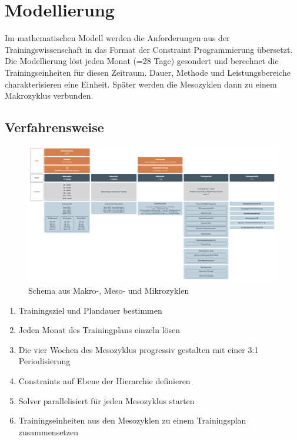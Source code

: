 \chapter{Modellierung}
\label{sec:modellierung}
Im mathematischen Modell werden die Anforderungen aus der Trainingswissenschaft in das Format der Constraint Programmierung übersetzt. Die Modellierung löst jeden Monat (=28 Tage) gesondert und berechnet die Trainingseinheiten für diesen Zeitraum. Dauer, Methode und Leistungsbereiche charakterisieren eine Einheit. Später werden die Mesozyklen dann zu einem Makrozyklus verbunden.

\section{Verfahrensweise}
\label{sec:modellierung:uebersicht}
\begin{figure}[htb]
\includegraphics[width=\textwidth]{gfx/modellierung.png}
\caption{Schema aus Makro-, Meso- und Mikrozyklen}
\label{fig:modellierung:schema}
\end{figure}

\begin{enumerate}
    \item Trainingsziel und Plandauer bestimmen
    \item Jeden Monat des Trainingplans einzeln lösen
    \item Die vier Wochen des Mesozyklus progressiv gestalten mit einer 3:1 Periodisierung
    \item Constraints auf Ebene der Hierarchie definieren 
    \item Solver parallelisiert für jeden Mesozyklus starten
    \item Trainingseinheiten aus den Mesozyklen zu einem Trainingsplan zusammensetzen
\end{enumerate}

